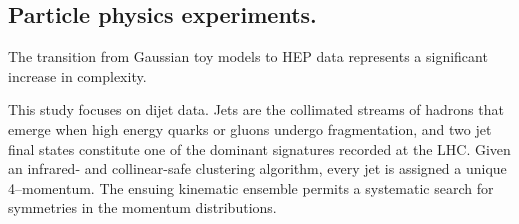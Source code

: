         \subsection{Particle physics experiments.}
            
            The transition from Gaussian toy models to HEP data represents a significant increase in complexity.

            This study focuses on dijet data.
            Jets are the collimated streams of hadrons that emerge when high energy quarks or gluons undergo fragmentation, and two jet final states constitute one of the dominant signatures recorded at the LHC.
            Given an infrared- and collinear-safe clustering algorithm, every jet is assigned a unique 4--momentum.
            The ensuing kinematic ensemble permits a systematic search for symmetries in the momentum distributions.

